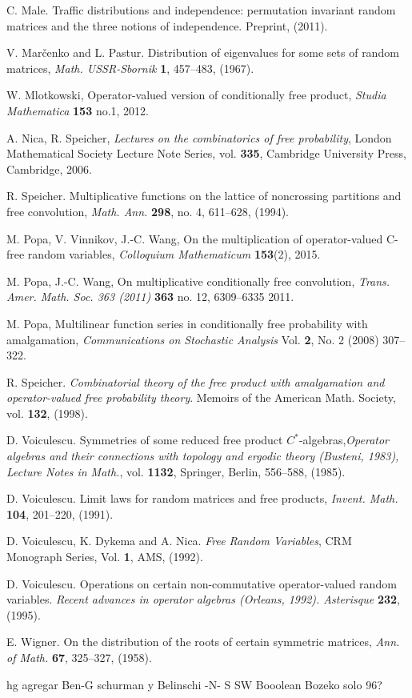 \begin{thebibliography}{99}
 C. Male. Traffic distributions and independence: permutation invariant random matrices and the three notions of independence. Preprint, (2011).

 V. Mar\v cenko and L. Pastur. Distribution of eigenvalues for some
sets of random matrices, \emph{Math. USSR-Sbornik} {\bf 1}, 457--483, (1967).

 W. Mlotkowski, Operator-valued version of conditionally free product, \emph{Studia Mathematica} {\bf 153} no.1, 2012.

 A. Nica, R. Speicher, \emph{Lectures on the combinatorics of free probability}, London Mathematical Society Lecture Note Series, vol. {\bf 335}, Cambridge University Press, Cambridge, 2006.

 R. Speicher. Multiplicative functions on the lattice of noncrossing partitions
and free convolution, \emph{Math. Ann.} {\bf 298}, no. 4, 611--628, (1994).

 M. Popa, V. Vinnikov, J.-C. Wang, On the multiplication of operator-valued C-free random variables, \emph{Colloquium Mathematicum} {\bf 153}(2), 2015.

 M. Popa, J.-C. Wang, On multiplicative conditionally free convolution, \emph{Trans. Amer. Math. Soc. 363 (2011)} {\bf 363} no. 12, 6309--6335 2011.

 M. Popa, Multilinear function series in conditionally free probability with amalgamation, \emph{Communications on Stochastic Analysis} Vol. {\bf 2}, No. 2 (2008) 307--322.

 R. Speicher. \emph{Combinatorial theory of the free product with amalgamation
and operator-valued free probability theory}. Memoirs of the American Math.
Society, vol. {\bf 132}, (1998).

 D. Voiculescu. Symmetries of some reduced free product $C^*$-algebras,\emph{Operator
algebras and their connections with topology and ergodic theory (Busteni,
1983), Lecture Notes in Math.}, vol. {\bf 1132}, Springer, Berlin, 556--588, (1985).

 D. Voiculescu. Limit laws for random matrices and free products, \emph{Invent. Math.} {\bf 104}, 201--220, (1991).

 D. Voiculescu, K. Dykema and A. Nica. \emph{Free Random Variables}, CRM Monograph Series, Vol. {\bf 1}, AMS, (1992).

 D. Voiculescu. Operations on certain non-commutative operator-valued random
variables. \emph{Recent advances in operator algebras (Orleans, 1992). Asterisque} {\bf 232}, (1995).

 E. Wigner. On the distribution of the roots of certain symmetric matrices, \emph{Ann. of Math.} {\bf 67}, 325--327, (1958).

\end{thebibliography}

hg
agregar Ben-G schurman y Belinschi -N- S 
SW Booolean
Bozeko solo 96?